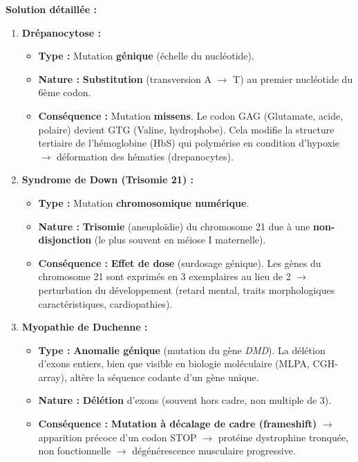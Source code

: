 \documentclass[11pt]{article}
\begin{document}
\begin{exoresolu}
    \tcblower
    \textbf{Solution détaillée :}
    \begin{enumerate}
        \item \textbf{Drépanocytose :}
              \begin{itemize}
                  \item \textbf{Type :} Mutation \textbf{génique} (échelle du nucléotide).
                  \item \textbf{Nature :} \textbf{Substitution} (transversion A $\rightarrow$ T) au premier nucléotide du 6ème codon.
                  \item \textbf{Conséquence :} Mutation \textbf{missens}. Le codon GAG (Glutamate, acide, polaire) devient GTG (Valine, hydrophobe). Cela modifie la structure tertiaire de l'hémoglobine (HbS) qui polymérise en condition d'hypoxie $\rightarrow$ déformation des hématies (drepanocytes).
              \end{itemize}
        \item \textbf{Syndrome de Down (Trisomie 21) :}
              \begin{itemize}
                  \item \textbf{Type :} Mutation \textbf{chromosomique numérique}.
                  \item \textbf{Nature :} \textbf{Trisomie} (aneuploïdie) du chromosome 21 due à une \textbf{non-disjonction} (le plus souvent en méiose I maternelle).
                  \item \textbf{Conséquence :} \textbf{Effet de dose} (surdosage génique). Les gènes du chromosome 21 sont exprimés en 3 exemplaires au lieu de 2 $\rightarrow$ perturbation du développement (retard mental, traits morphologiques caractéristiques, cardiopathies).
              \end{itemize}
        \item \textbf{Myopathie de Duchenne :}
              \begin{itemize}
                  \item \textbf{Type :} \textbf{Anomalie génique} (mutation du gène \emph{DMD}). La délétion d'exons entiers, bien que visible en biologie moléculaire (MLPA, CGH-array), altère la séquence codante d'un gène unique.
                  \item \textbf{Nature :} \textbf{Délétion} d'exons (souvent hors cadre, non multiple de 3).
                  \item \textbf{Conséquence :} \textbf{Mutation à décalage de cadre (frameshift)} $\rightarrow$ apparition précoce d'un codon STOP $\rightarrow$ protéine dystrophine tronquée, non fonctionnelle $\rightarrow$ dégénérescence musculaire progressive.

\end{itemize}
\end{enumerate}
\end{exoresolu}
\end{document}
